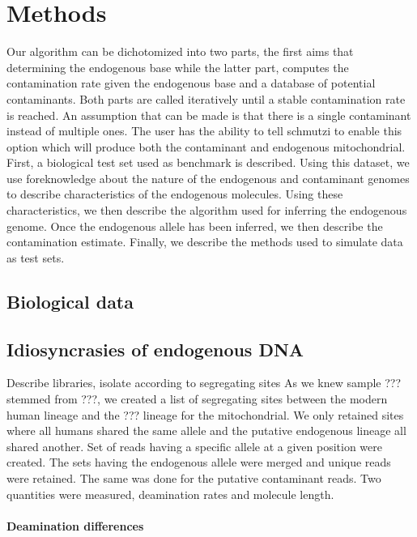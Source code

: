 \documentclass[a4paper,12pt]{article}
\begin{document}
\section{Methods}

Our algorithm can be dichotomized into two parts, the first aims that determining the endogenous base while the latter part, computes the contamination rate given the endogenous base and a database of potential contaminants. Both parts are called iteratively until a stable contamination rate is reached. An assumption that can be made is that there is a single contaminant instead of multiple ones. The user has the ability to tell schmutzi to enable this option which will produce both the contaminant and endogenous mitochondrial. First, a biological test set used as benchmark is described. Using this dataset, we use foreknowledge about the nature of the endogenous and contaminant genomes to describe characteristics of the endogenous molecules. Using these characteristics, we then describe the algorithm used for inferring the endogenous genome. Once the endogenous allele has been inferred, we then describe the contamination estimate. Finally, we describe the methods used to simulate data as test sets.


\subsection{Biological data}
\label{seq:biologicaldata}


\subsection{Idiosyncrasies of endogenous DNA}
\label{seq:endodeampattern}
Describe libraries, isolate according to segregating sites
As we knew sample ??? stemmed from ???, we created a list of segregating sites between the modern human lineage and the ??? lineage for the mitochondrial. We only retained sites where all humans shared the same allele and the putative endogenous lineage all shared another. Set of reads having a specific allele at a given position were created. The sets having the endogenous allele were merged and unique reads were retained. The same was done for the putative contaminant reads. Two quantities were measured, deamination rates and molecule length. 

\noindent \paragraph{Deamination differences}
\end{document}
